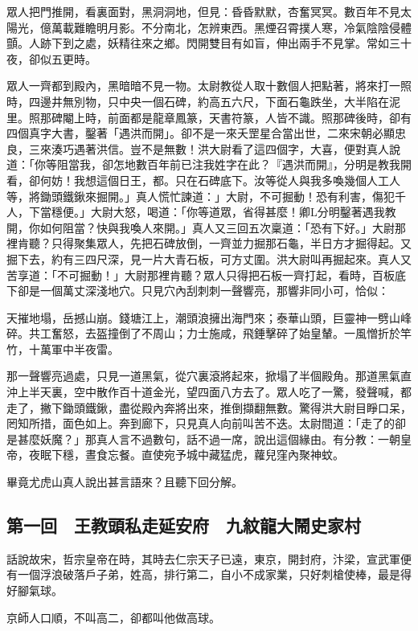 \documentclass[11pt,a4paper]{article}
\begin{document}
眾人把門推開，看裏面對，黑洞洞地，但見：昏昏默默，杏奮冥冥。數百年不見太陽光，億萬載難瞻明月影。不分南北，怎辨東西。黑煙召霄撲人寒，冷氣陰陰侵體顫。人跡下到之處，妖精往來之鄉。閃開雙目有如盲，伸出兩手不見掌。常如三十夜，卻似五更時。

眾人一齊都到殿內，黑暗暗不見一物。太尉教從人取十數個人把點著，將來打一照時，四邊井無別物，只中央一個石碑，約高五六尺，下面石龜跌坐，大半陷在泥里。照那碑閹上時，前面都是龍章鳳篆，天書符篆，人皆不識。照那碑後時，卻有四個真字大書，鑿著「遇洪而開」。卻不是一來夭罡星合當出世，二來宋朝必顯忠良，三來湊巧遇著洪信。豈不是無數！洪大尉看了這四個字，大喜，便對真人說道：「你等阻當我，卻怎地數百年前已注我姓字在此？『遇洪而開』，分明是教我開看，卻何妨！我想這個日王，都。只在石碑底下。汝等從人與我多喚幾個人工人等，將鋤頭鐵鍬來掘開。」真人慌忙諫道：」大尉，不可掘動！恐有利害，傷犯千人，下當穩便。」大尉大怒，喝道：「你等道眾，省得甚麼！卿L分明鑿著遇我教開，你如何阻當？快與我喚人來開。」真人又三回五次稟道：「恐有下好。」大尉那裡肯聽？只得聚集眾人，先把石碑放倒，一齊並力掘那石龜，半日方才掘得起。又掘下去，約有三四尺深，見一片大青石板，可方丈圍。洪大尉叫再掘起來。真人又苦享道：「不可掘動！」大尉那裡肯聽？眾人只得把石板一齊打起，看時，百板底下卻是一個萬丈深淺地穴。只見穴內刮刺刺一聲響亮，那響非同小可，恰似：

天摧地塌，岳撼山崩。錢塘江上，潮頭浪擁出海門來；泰華山頭，巨靈神一劈山峰碎。共工奮怒，去盔撞倒了不周山；力士施咸，飛錘擊碎了始皇輦。一風憎折於竿竹，十萬軍中半夜雷。

那一聲響亮過處，只見一道黑氣，從穴裏滾將起來，掀塌了半個殿角。那道黑氣直沖上半天裏，空中散作百十道金光，望四面八方去了。眾人吃了一驚，發聲喊，都走了，撇下鋤頭鐵鍬，盡從殿內奔將出來，推倒擷翻無數。驚得洪大尉目睜口呆，罔知所措，面色如上。奔到廊下，只見真人向前叫苦不迭。太尉間道：「走了的卻是甚麼妖魔？」那真人言不過數句，話不過一席，說出這個緣由。有分教：一朝皇帝，夜眠下穩，晝食忘餐。直使宛予城中藏猛虎，蘿兒窪內聚神蚊。

畢竟尤虎山真人說出甚言語來？且聽下回分解。

\subsection{第一回　王教頭私走延安府　九紋龍大鬧史家村}

話說故宋，哲宗皇帝在時，其時去仁宗天子已遠，東京，開封府，汴梁，宣武軍便有一個浮浪破落戶子弟，姓高，排行第二，自小不成家業，只好刺槍使棒，最是得好腳氣球。

京師人口順，不叫高二，卻都叫他做高球。
\end{document}
